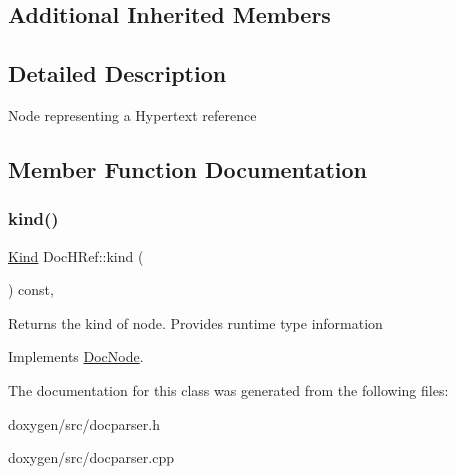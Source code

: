 \subsection*{Additional Inherited Members}


\subsection{Detailed Description}
Node representing a Hypertext reference 

\subsection{Member Function Documentation}
\mbox{\label{class_doc_h_ref_a19a1050d1b9c755f3d76dce4f8d5a4df}} 
\subsubsection{\texorpdfstring{kind()}{kind()}}
{\footnotesize\ttfamily \mbox{\hyperlink{class_doc_node_aebd16e89ca590d84cbd40543ea5faadb}{Kind}} Doc\+H\+Ref\+::kind (\begin{DoxyParamCaption}{ }\end{DoxyParamCaption}) const\hspace{0.3cm}{\ttfamily [inline]}, {\ttfamily [virtual]}}

Returns the kind of node. Provides runtime type information 

Implements \mbox{\hyperlink{class_doc_node_a108ffd214a72ba6e93dac084a8f58049}{Doc\+Node}}.



The documentation for this class was generated from the following files\+:\begin{DoxyCompactItemize}
\item 
doxygen/src/docparser.\+h\item 
doxygen/src/docparser.\+cpp\end{DoxyCompactItemize}
